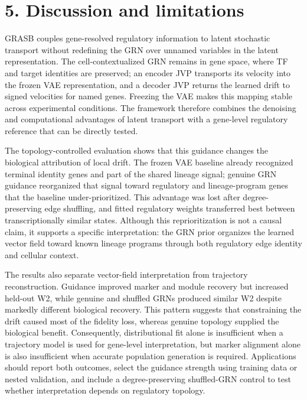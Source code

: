 \documentclass[
  11pt,
  letterpaper,
]{article}
\begin{document}
\FloatBarrier
\section{5. Discussion and
limitations}\label{discussion-and-limitations}

GRASB couples gene-resolved regulatory information to
latent stochastic transport without redefining the GRN over unnamed
variables in the latent representation. The cell-contextualized GRN remains in gene space,
where TF and target identities are preserved; an encoder JVP transports
its velocity into the frozen VAE representation, and a decoder JVP
returns the learned drift to signed velocities for named genes. Freezing
the VAE makes this mapping stable across experimental conditions. The
framework therefore combines the denoising and computational advantages
of latent transport with a gene-level regulatory reference that can be
directly tested.

The topology-controlled evaluation shows that this guidance changes the
biological attribution of local drift. The frozen VAE baseline already
recognized terminal identity genes and part of the shared lineage signal;
genuine GRN guidance reorganized that signal toward regulatory and
lineage-program genes that the baseline under-prioritized. This advantage
was lost after degree-preserving edge shuffling, and fitted regulatory
weights transferred best between transcriptionally similar states.
Although this reprioritization is not a causal claim, it supports a
specific interpretation: the GRN prior organizes the learned vector
field toward known lineage programs through both regulatory edge identity
and cellular context.

The results also separate vector-field interpretation from trajectory
reconstruction. Guidance improved marker
and module recovery but increased held-out W2, while genuine and shuffled
GRNs produced similar W2 despite markedly different biological recovery.
This pattern suggests that constraining the drift caused most of the
fidelity loss, whereas genuine topology supplied the biological benefit.
Consequently, distributional fit alone is insufficient when a trajectory
model is used for gene-level interpretation, but marker alignment alone
is also insufficient when accurate population generation is required.
Applications should report both outcomes, select the guidance strength
using training data or nested validation, and include a
degree-preserving shuffled-GRN control to test whether interpretation
depends on regulatory topology.
\end{document}
